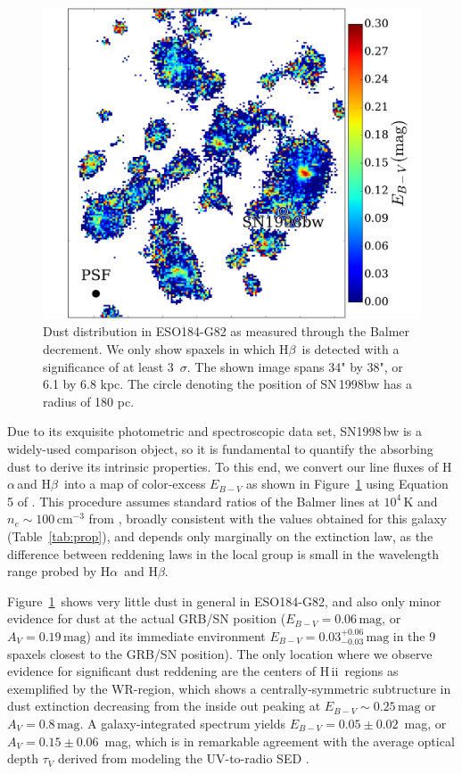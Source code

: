 \documentclass[traditabstract]{aa}
\newcommand{\hb}{H$\beta$}
\newcommand{\ha}{H$\alpha$}
\newcommand{\hii}{\mbox{H\,{\sc ii}}}
\begin{document}
\begin{figure}
\includegraphics[angle=0, width=0.99\columnwidth]{Figs/MUSE_SN1998bw_EB-V.pdf}
\caption{Dust distribution in ESO184-G82 as measured through the Balmer decrement. We only show spaxels in which \hb\, is detected with a significance of at least 3~$\sigma$. The shown image spans 34" by 38", or 6.1 by 6.8 kpc. The circle denoting the position of SN\,1998bw has a radius of 180 pc.}
\label{fig:ebv}
\end{figure}

Due to its exquisite photometric and spectroscopic data set, SN1998\,bw is a widely-used comparison object, so it is fundamental to quantify the absorbing dust to derive its intrinsic properties. To this end, we convert our line fluxes of \ha\,and \hb\, into a map of color-excess $E_{B-V}$ as shown in Figure~\ref{fig:ebv} using Equation 5 of \citet{2015A&A...581A.125K}. This procedure assumes standard ratios of the Balmer lines at $10^4$\,K and $n_e\sim100\,\mathrm{cm}^{-3}$ from \citet{1989agna.book.....O}, broadly consistent with the values obtained for this galaxy (Table~\ref{tab:prop}), and depends only marginally on the extinction law, as the difference between reddening laws in the local group is small in the wavelength range probed by \ha\, and \hb. 

Figure~\ref{fig:ebv}~shows very little dust in general in ESO184-G82, and also only minor evidence for dust at the actual GRB/SN position ($E_{B-V} = 0.06\,\mathrm{mag}$, or $A_V = 0.19\,\mathrm{mag}$) and its immediate environment $E_{B-V} = 0.03_{-0.03}^{+0.06}\,\mathrm{mag}$ in the 9 spaxels closest to the GRB/SN position). The only location where we observe evidence for significant dust reddening are the centers of \hii\, regions as exemplified by the WR-region, which shows a centrally-symmetric subtructure in dust extinction decreasing from the inside out peaking at $E_{B-V} \sim 0.25\,\mathrm{mag}$ or $A_V = 0.8\,\mathrm{mag}$. A galaxy-integrated spectrum yields $E_{B-V} = 0.05\pm0.02$~mag, or $A_V=0.15\pm0.06$~mag, which is in remarkable agreement with the average optical depth $\tau_V$ derived from modeling the UV-to-radio SED \citep{2014A&A...562A..70M}.
\end{document}
